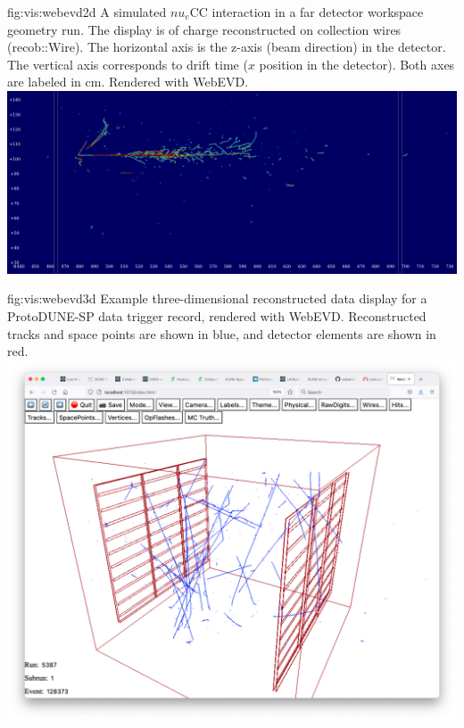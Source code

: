 \documentclass[../main-v1.tex]{subfiles}
\begin{document}
\begin{dunefigure}
{fig:vis:webevd2d} 
{A simulated $nu_e$CC interaction in a far detector workspace geometry run. The display is of charge reconstructed on collection wires (recob::Wire). The horizontal axis is the z-axis (beam direction) in the detector. The vertical axis corresponds to drift time ($x$ position in the detector). Both axes are labeled in cm. Rendered with WebEVD. }
\includegraphics[width=0.9 \textwidth]{graphics/EventDisplays/webevd_nuecc_sim.png}
\end{dunefigure}

\begin{dunefigure}
{fig:vis:webevd3d} 
{ Example three-dimensional reconstructed data display for a ProtoDUNE-SP data trigger record, rendered with WebEVD. Reconstructed tracks and space points are shown in blue, and detector elements are shown in red.}
\includegraphics[width=0.9 \textwidth]{graphics/EventDisplays/webevd_pdsp3d.png}
\end{dunefigure}
\end{document}
